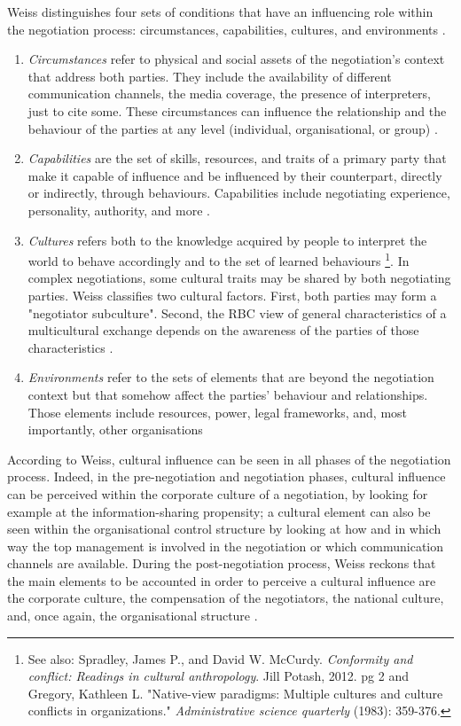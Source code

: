 \documentclass[../main.tex]{subfiles}
\begin{document}
Weiss distinguishes four sets of conditions that have an influencing role within the negotiation process: circumstances, capabilities, cultures, and environments \autocite[287]{weiss}.
\begin{enumerate}
    \item \textit{Circumstances} refer to physical and social assets of the negotiation's context that address both parties. They include the availability of different communication channels, the media coverage, the presence of interpreters, just to cite some. These circumstances can influence the relationship and the behaviour of the parties at any level (individual, organisational, or group) \autocite[287]{weiss}.
    \item \textit{Capabilities} are the set of skills, resources, and traits of a primary party that make it capable of influence and be influenced by their counterpart, directly or indirectly, through behaviours. Capabilities include negotiating experience, personality, authority, and more \autocite[288]{weiss}.
    \item \textit{Cultures} refers both to the knowledge acquired by people to interpret the world to behave accordingly and to the set of learned behaviours \autocite[288]{weiss}\footnote{See also: Spradley, James P., and David W. McCurdy. \textit{Conformity and conflict: Readings in cultural anthropology}. Jill Potash, 2012. pg 2  and\\
    Gregory, Kathleen L. "Native-view paradigms: Multiple cultures and culture conflicts in organizations." \textit{Administrative science quarterly} (1983): 359-376.}.
    In complex negotiations, some cultural traits may be shared by both negotiating parties. Weiss classifies two cultural factors. First, both parties may form a "negotiator subculture". Second, the RBC view of general characteristics of a multicultural exchange depends on the awareness of the parties of those characteristics \mancite\autocite[289]{weiss}.
   \item \textit{Environments} refer to the sets of elements that are beyond the negotiation context but that somehow affect the parties' behaviour and relationships. Those elements include resources, power, legal frameworks, and, most importantly, other organisations 
\end{enumerate}

According to Weiss, cultural influence can be seen in all phases of the negotiation process. Indeed, in the pre-negotiation and negotiation phases, cultural influence can be perceived within the corporate culture of a negotiation, by looking for example at the information-sharing propensity; a cultural element can also be seen within the organisational control structure by looking at how and in which way the top management is involved in the negotiation or which communication channels are available. During the post-negotiation process, Weiss reckons that the main elements to be accounted in order to perceive a cultural influence are the corporate culture, the compensation of the negotiators, the national culture, and, once again, the organisational structure \mancite\autocite[285]{weiss}.
\end{document}
